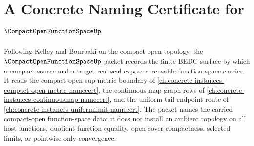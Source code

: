 \chapter{A Concrete Naming Certificate for $\CompactOpenFunctionSpaceUp$}
\label{ch:concrete-instances-compact-open-function-space-namecert}

Following Kelley and Bourbaki on the compact-open topology, the $\CompactOpenFunctionSpaceUp$ packet records the finite BEDC surface by which a compact source and a target real seal expose a reusable function-space carrier. It reads the compact-open sup-metric boundary of \autoref{ch:concrete-instances-compact-open-metric-namecert}, the continuous-map graph rows of \autoref{ch:concrete-instances-continuousmap-namecert}, and the uniform-tail endpoint route of \autoref{ch:concrete-instances-uniformlimit-namecert}. The packet names the carried compact-open function-space data; it does not install an ambient topology on all host functions, quotient function equality, open-cover compactness, selected limits, or pointwise-only convergence.

